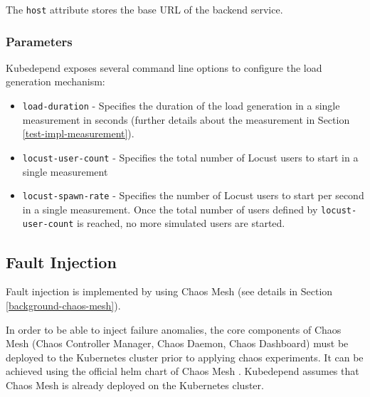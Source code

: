 The \texttt{host} attribute stores the base URL of the backend service.


\subsubsection{Parameters}

Kubedepend exposes several command line options to configure the load generation mechanism:

\begin{itemize}
	\item \texttt{load-duration} - Specifies the duration of the load generation in a single measurement in seconds (further details about the measurement in Section \ref{test-impl-measurement}). 
	\item \texttt{locust-user-count} - Specifies the total number of Locust users to start in a single measurement
	\item \texttt{locust-spawn-rate} - Specifies the number of Locust users to start per second in a single measurement. Once the total number of users defined by \texttt{locust-user-count} is reached, no more simulated users are started. 
\end{itemize}


\subsection{Fault Injection}


Fault injection is implemented by using Chaos Mesh (see details in Section \ref{background-chaos-mesh}).

In order to be able to inject failure anomalies, the core components of Chaos Mesh (Chaos Controller Manager, Chaos Daemon, Chaos Dashboard) must be deployed to the Kubernetes cluster prior to applying chaos experiments. It can be achieved using the official helm chart of Chaos Mesh \cite{ChaosMeshChart}. Kubedepend assumes that Chaos Mesh is already deployed on the Kubernetes cluster.

